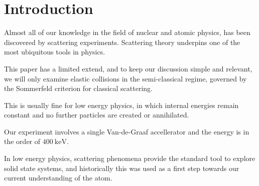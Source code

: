 \section{Introduction} 

Almost all of our knowledge in the field of nuclear and atomic physics, has been
discovered by scattering experiments. Scattering theory underpins one of the
most ubiquitous tools in physics. 

This paper has a limited extend, and to keep our discussion simple and
relevant, we will only examine elastic collisions in the semi-classical regime,
governed by the Sommerfeld criterion for classical scattering.

This is usually fine for low energy physics, in which internal energies remain
constant and no further particles are created or annihilated. 

Our experiment involves a single Van-de-Graaf accellerator and the energy is in
the order of $\SI{400}{\kilo\electronvolt}$.

In low energy physics, scattering phenomena provide the standard tool to
explore solid state systems, and historically this was used as a first step
towards our current understanding of the atom.

